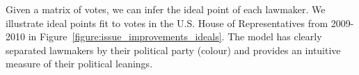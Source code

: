 Given a matrix of votes, we can infer the ideal point of each
lawmaker.  We illustrate ideal points fit to votes in the U.S. House
of Representatives from 2009-2010 in
Figure~\ref{figure:issue_improvements_ideals}.  The model has clearly
separated lawmakers by their political party (colour) and provides an
intuitive measure of their political leanings.






